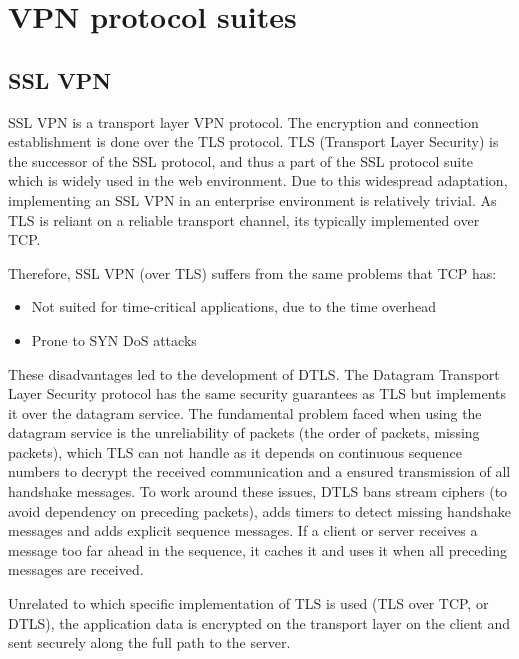 \documentclass[a4paper]{report}
\begin{document}
\section{VPN protocol suites}
\label{sec:VPNs}

\subsection{SSL VPN}
\label{ssec:sslvpn}

SSL VPN is a transport layer VPN protocol. The encryption and connection establishment is done over the TLS protocol. TLS (Transport Layer Security) is the successor of the SSL protocol, and thus a part of the SSL protocol suite which is widely used in the web environment. Due to this widespread adaptation, implementing an SSL VPN in an enterprise environment is relatively trivial. As TLS is reliant on a reliable transport channel, its typically implemented over TCP. \parencite[6,96]{Dierks2008}

Therefore, SSL VPN (over TLS) suffers from the same problems that TCP has:

\begin{itemize}
	\item Not suited for time-critical applications, due to the time overhead
	\item Prone to SYN DoS attacks
\end{itemize}

These disadvantages led to the development of DTLS. The Datagram Transport Layer Security protocol has the same security guarantees as TLS but implements it over the datagram service. The fundamental problem faced when using the datagram service is the unreliability of packets (the order of packets, missing packets), which TLS can not handle as it depends on continuous sequence numbers to decrypt the received communication and a ensured transmission of all handshake messages. To work around these issues, DTLS bans stream ciphers (to avoid dependency on preceding packets), adds timers to detect missing handshake messages and adds explicit sequence messages. If a client or server receives a message too far ahead in the sequence, it caches it and uses it when all preceding messages are received. \parencite[5-15]{Rescorla2012}

Unrelated to which specific implementation of TLS is used (TLS over TCP, or DTLS), the application data is encrypted on the transport layer on the client and sent securely along the full path to the server.
\end{document}
